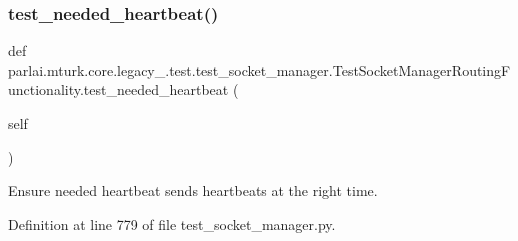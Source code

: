 \subsubsection{\texorpdfstring{test\+\_\+needed\+\_\+heartbeat()}{test\_needed\_heartbeat()}}
{\footnotesize\ttfamily def parlai.\+mturk.\+core.\+legacy\+\_.\+test.\+test\+\_\+socket\+\_\+manager.\+Test\+Socket\+Manager\+Routing\+Functionality.\+test\+\_\+needed\+\_\+heartbeat (\begin{DoxyParamCaption}\item[{}]{self }\end{DoxyParamCaption})}

\begin{DoxyVerb}Ensure needed heartbeat sends heartbeats at the right time.
\end{DoxyVerb}
 

Definition at line 779 of file test\+\_\+socket\+\_\+manager.\+py.


